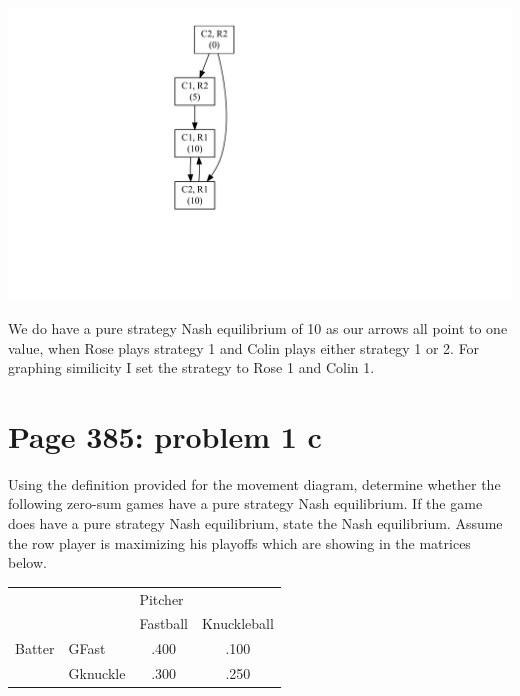 \documentclass[]{article}
\begin{document}
\includegraphics{Christophe_Hunt_hw9_files/figure-latex/unnamed-chunk-1-1.pdf}

We do have a pure strategy Nash equilibrium of 10 as our arrows all
point to one value, when Rose plays strategy 1 and Colin plays either
strategy 1 or 2. For graphing similicity I set the strategy to Rose 1
and Colin 1.

\newpage

\section{Page 385: problem 1 c}\label{page-385-problem-1-c}

Using the definition provided for the movement diagram, determine
whether the following zero-sum games have a pure strategy Nash
equilibrium. If the game does have a pure strategy Nash equilibrium,
state the Nash equilibrium. Assume the row player is maximizing his
playoffs which are showing in the matrices below.

\begin{table}[!h]
\centering
\begin{tabular}{lllc}
 &  & \multicolumn{2}{l}{Pitcher} \\ \cline{3-4}
 &  & Fastball & \multicolumn{1}{l}{Knuckleball} \\ \hline
Batter & GFast & \multicolumn{1}{c}{.400} & .100 \\
 & Gknuckle & \multicolumn{1}{c}{.300} & .250 \\ \hline
\end{tabular}
\end{table}
\end{document}

